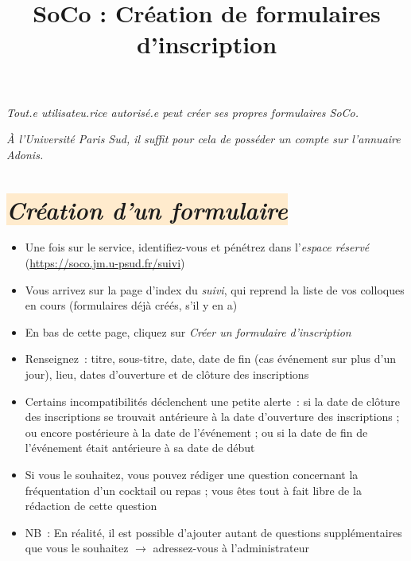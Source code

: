 \documentclass[10pt,a4paper]{article}
\title{\bfseries{SoCo : Création de formulaires d'inscription}}
\author{}
\date{}
\newcommand{\rosepale}[1]{\colorbox{BlanchedAlmond}{#1}}
\begin{document}
\pagestyle{empty}


\maketitle

\emph{Tout.e utilisateu.rice autorisé.e peut créer ses propres formulaires SoCo.}

\emph{À l'Université Paris Sud, il suffit pour cela de posséder un compte sur l'annuaire Adonis.}


\section*{\rosepale{\emph{Création d'un formulaire}}}

\begin{itemize}
  \item Une fois sur le service, identifiez-vous et pénétrez dans l'\emph{espace réservé} (\url{https://soco.jm.u-psud.fr/suivi})
  \item Vous arrivez sur la page d'index du \emph{suivi}, qui reprend la liste de vos colloques en cours (formulaires déjà créés, s'il y en a)
  \item En bas de cette page, cliquez sur \emph{Créer un formulaire d'inscription}
  \item Renseignez : titre, sous-titre, date, date de fin (cas événement sur plus d'un jour), lieu, dates d'ouverture et de clôture des inscriptions
    \item Certains incompatibilités déclenchent une petite alerte : si la date de clôture des inscriptions se trouvait antérieure à la date d'ouverture des inscriptions ; ou encore postérieure à la date de l'événement ; ou si la date de fin de l'événement était antérieure à sa date de début
  \item Si vous le souhaitez, vous pouvez rédiger une question concernant la fréquentation d'un cocktail ou repas ; vous êtes tout à fait libre de la rédaction de cette question
  \item NB : En réalité, il est possible d'ajouter autant de questions supplémentaires que vous le souhaitez $\longrightarrow$ adressez-vous à l'administrateur

\end{itemize}
\end{document}
